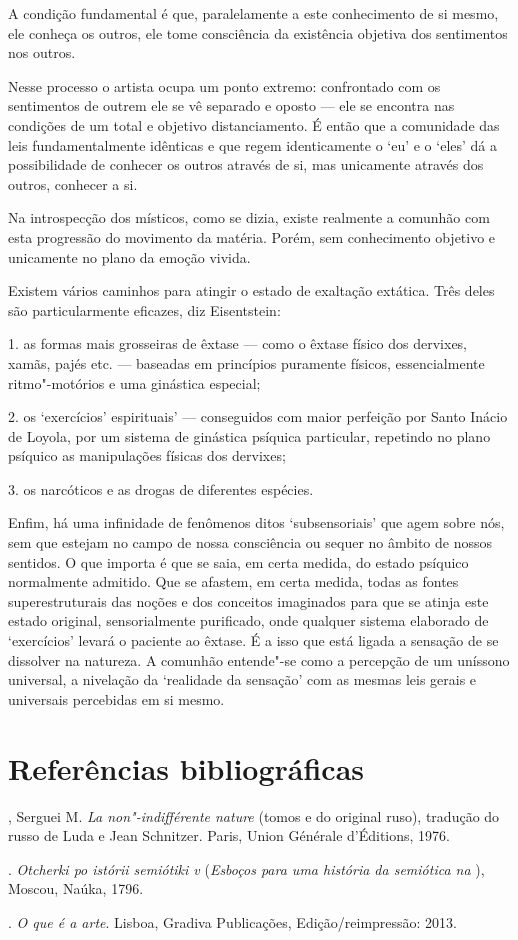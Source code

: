 A condição fundamental é que, paralelamente a este conhecimento de si
mesmo, ele conheça os outros, ele tome consciência da existência
objetiva dos sentimentos nos outros.

Nesse processo o artista ocupa um ponto extremo: confrontado com os
sentimentos de outrem ele se vê separado e oposto --- ele se encontra nas
condições de um total e objetivo distanciamento. É então que a
comunidade das leis fundamentalmente idênticas e que regem identicamente
o `eu' e o `eles' dá a possibilidade de conhecer os outros através de
si, mas unicamente através dos outros, conhecer a si.

Na introspecção dos místicos, como se dizia, existe realmente a comunhão
com esta progressão do movimento da matéria. Porém, sem conhecimento
objetivo e unicamente no plano da emoção vivida.

Existem vários caminhos para atingir o estado de exaltação extática.
Três deles são particularmente eficazes, diz Eisentstein:

1. as formas mais grosseiras de êxtase --- como o êxtase físico dos
dervixes, xamãs, pajés etc. --- baseadas em princípios puramente físicos,
essencialmente ritmo"-motórios e uma ginástica especial;

2. os `exercícios' espirituais' --- conseguidos com maior perfeição por
Santo Inácio de Loyola, por um sistema de ginástica psíquica particular,
repetindo no plano psíquico as manipulações físicas dos dervixes;

3. os narcóticos e as drogas de diferentes espécies.

Enfim, há uma infinidade de fenômenos ditos `subsensoriais' que agem
sobre nós, sem que estejam no campo de nossa consciência ou sequer no
âmbito de nossos sentidos. O que importa é que se saia, em certa medida,
do estado psíquico normalmente admitido. Que se afastem, em certa
medida, todas as fontes superestruturais das noções e dos conceitos
imaginados para que se atinja este estado original, sensorialmente
purificado, onde qualquer sistema elaborado de `exercícios' levará o
paciente ao êxtase. É a isso que está ligada a sensação de se dissolver
na natureza. A comunhão entende"-se como a percepção de um uníssono
universal, a nivelação da `realidade da sensação' com as mesmas leis
gerais e universais percebidas em si mesmo.

\section{Referências bibliográficas}

, Serguei M. \emph{La non"-indifférente nature } (tomos 
e  do original ruso), tradução do russo de Luda e Jean Schnitzer.
Paris, Union Générale d'Éditions, 1976.

. \emph{Otcherki po istórii semiótiki v } (\emph{Esboços
para uma história da semiótica na }), Moscou, Naúka, 1796.

. \emph{O que é a arte}. Lisboa, Gradiva Publicações,
Edição/reimpressão: 2013.
